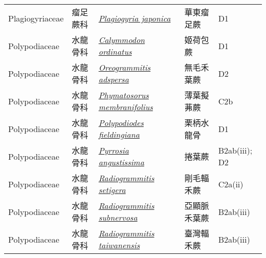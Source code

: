 {\begin{longtable}{p{2.5cm}p{2cm}p{5cm}p{2.5cm}p{3cm}}
    Plagiogyriaceae & 瘤足蕨科 & \href{http://www.theplantlist.org/tpl1.1/search?q=Plagiogyria+japonica}{\textit{Plagiogyria japonica} } & 華東瘤足蕨 & D1 \index{Plagiogyria@\textit{Plagiogyria}!japonica@\textit{japonica}}  \index{華東瘤足蕨} \\
    Polypodiaceae & 水龍骨科 & \href{http://www.theplantlist.org/tpl1.1/search?q=Calymmodon+ordinatus}{\textit{Calymmodon ordinatus} } & 姬荷包蕨 & D1 \index{Calymmodon@\textit{Calymmodon}!ordinatus@\textit{ordinatus}}  \index{姬荷包蕨} \\
    Polypodiaceae & 水龍骨科 & \href{http://www.theplantlist.org/tpl1.1/search?q=Oreogrammitis+adspersa}{\textit{Oreogrammitis adspersa} } & 無毛禾葉蕨 & D2 \index{Oreogrammitis@\textit{Oreogrammitis}!adspersa@\textit{adspersa}}  \index{無毛禾葉蕨} \\
    Polypodiaceae & 水龍骨科 & \href{http://www.theplantlist.org/tpl1.1/search?q=Phymatosorus+membranifolius}{\textit{Phymatosorus membranifolius} } & 薄葉擬茀蕨 & C2b \index{Phymatosorus@\textit{Phymatosorus}!membranifolius@\textit{membranifolius}}  \index{薄葉擬茀蕨} \\
    Polypodiaceae & 水龍骨科 & \href{http://www.theplantlist.org/tpl1.1/search?q=Polypodiodes+fieldingiana}{\textit{Polypodiodes fieldingiana} } & 栗柄水龍骨 & D1 \index{Polypodiodes@\textit{Polypodiodes}!fieldingiana@\textit{fieldingiana}}  \index{栗柄水龍骨} \\
    Polypodiaceae & 水龍骨科 & \href{http://www.theplantlist.org/tpl1.1/search?q=Pyrrosia+angustissima}{\textit{Pyrrosia angustissima} } & 捲葉蕨 & B2ab(iii); D2 \index{Pyrrosia@\textit{Pyrrosia}!angustissima@\textit{angustissima}}  \index{捲葉蕨} \\
    Polypodiaceae & 水龍骨科 & \href{http://www.theplantlist.org/tpl1.1/search?q=Radiogrammitis+setigera}{\textit{Radiogrammitis setigera} } & 剛毛輻禾蕨 & C2a(ii) \index{Radiogrammitis@\textit{Radiogrammitis}!setigera@\textit{setigera}}  \index{剛毛輻禾蕨} \\
    Polypodiaceae & 水龍骨科 & \href{http://www.theplantlist.org/tpl1.1/search?q=Radiogrammitis+subnervosa}{\textit{Radiogrammitis subnervosa} } & 亞顯脈禾葉蕨 & B2ab(iii) \index{Radiogrammitis@\textit{Radiogrammitis}!subnervosa@\textit{subnervosa}}  \index{亞顯脈禾葉蕨} \\
    Polypodiaceae & 水龍骨科 & \href{http://www.theplantlist.org/tpl1.1/search?q=Radiogrammitis+taiwanensis}{\textit{Radiogrammitis taiwanensis} } & 臺灣輻禾蕨 & B2ab(iii) \index{Radiogrammitis@\textit{Radiogrammitis}!taiwanensis@\textit{taiwanensis}}  \index{臺灣輻禾蕨} \\

\end{longtable}}
